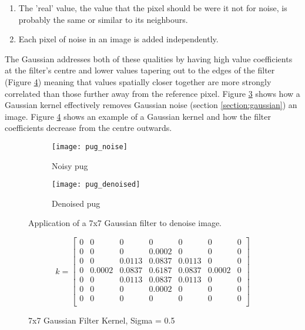 \begin{enumerate}
    \item The 'real' value, the value that the pixel should be were it not for noise, is probably the same or similar to its neighbours. 
    \item Each pixel of noise in an image is added independently.
\end{enumerate}

The Gaussian addresses both of these qualities by having high value coefficients at the filter's centre and lower values tapering out to the edges of the filter (Figure \ref{fig:gauss_kernel}) meaning that values spatially closer together are more strongly correlated than those further away from the reference pixel. Figure \ref{fig:pug_noise} shows how a Gaussian kernel effectively removes Gaussian noise (section \ref{section:gaussian}) an image. Figure \ref{fig:gauss_kernel} shows an example of a Gaussian kernel and how the filter coefficients decrease from the centre outwards.

\begin{figure}[H]
    \centering
    \begin{subfigure}[b]{0.3\textwidth}
        \texttt{[image: pug\_noise]}
        \caption{Noisy pug}
        \label{fig:pug_noise}
    \end{subfigure}
    \begin{subfigure}[b]{0.3\textwidth}
        \texttt{[image: pug\_denoised]}
        \caption{Denoised pug}
        \label{fig:pug_denoised}
    \end{subfigure}
    \caption{Application of a 7x7 Gaussian filter to denoise image.}
    \label{fig:pug_noise}
\end{figure}


\begin{figure}[H]
    \centering
    \[k =
    \begin{bmatrix}
       0 & 0 & 0 & 0 & 0 & 0 & 0 \\
       0 & 0 & 0 & 0.0002 & 0 & 0 & 0 \\
       0 & 0 & 0.0113  & 0.0837 & 0.0113  & 0 & 0 \\
       0 & 0.0002 & 0.0837 & 0.6187 & 0.0837 & 0.0002 & 0 \\
       0 & 0 & 0.0113 & 0.0837 & 0.0113 & 0 & 0 \\
       0 & 0 & 0 & 0.0002 & 0 & 0 & 0 \\
       0 & 0 & 0 & 0 & 0 & 0 & 0 \\
    \end{bmatrix}
    \]
    \caption{7x7 Gaussian Filter Kernel, Sigma = 0.5}
    \label{fig:gauss_kernel}
\end{figure}

